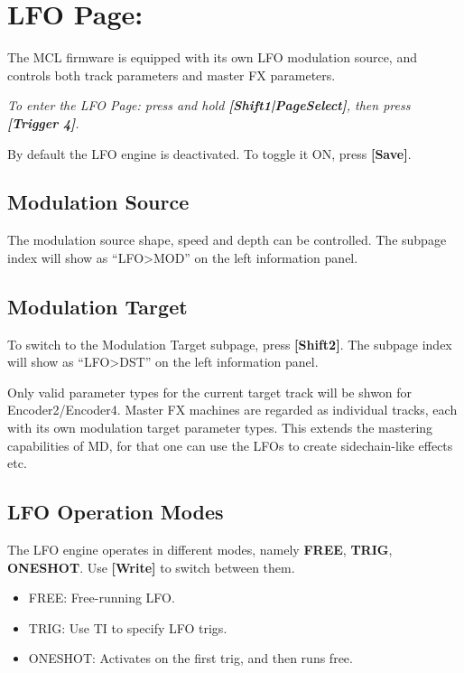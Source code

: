 \chapter{LFO Page:}
The MCL firmware is equipped with its own LFO modulation source, and controls both track parameters and master FX parameters.

\textit{To enter the LFO Page: press and hold \textbf{[Shift1|PageSelect]}, then press \textbf{[Trigger 4]}.}

By default the LFO engine is deactivated. To toggle it ON, press \textbf{[Save]}.


\section{Modulation Source}

The modulation source shape, speed and depth can be controlled. The subpage index will show as ``LFO>MOD'' on the left information panel.


\newpage


\section{Modulation Target}
To switch to the Modulation Target subpage, press \textbf{[Shift2]}. The subpage index will show as ``LFO>DST'' on the left information panel.


Only valid parameter types for the current target track will be shwon for Encoder2/Encoder4. Master FX machines are regarded as individual tracks, each with its own modulation target parameter types. This extends the mastering capabilities of MD, for that one can use the LFOs to create sidechain-like effects etc.


\section{LFO Operation Modes}

The LFO engine operates in different modes, namely \textbf{FREE}, \textbf{TRIG}, \textbf{ONESHOT}. Use \textbf{[Write]} to switch between them.
\begin{itemize}
    \item FREE: Free-running LFO.
    \item TRIG: Use TI to specify LFO trigs.
    \item ONESHOT: Activates on the first trig, and then runs free.
\end{itemize}